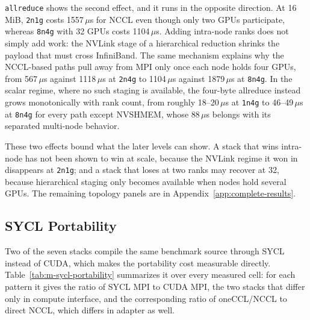 \texttt{allreduce} shows the second effect, and it runs in the opposite direction. At 16\,MiB, \texttt{2n1g} costs 1557\,$\mu$s for NCCL even though only two GPUs participate, whereas \texttt{8n4g} with 32 GPUs costs 1104\,$\mu$s. Adding intra-node ranks does not simply add work: the NVLink stage of a hierarchical reduction shrinks the payload that must cross InfiniBand. The same mechanism explains why the NCCL-based paths pull away from MPI only once each node holds four GPUs, from 567\,$\mu$s against 1118\,$\mu$s at \texttt{2n4g} to 1104\,$\mu$s against 1879\,$\mu$s at \texttt{8n4g}. In the scalar regime, where no such staging is available, the four-byte allreduce instead grows monotonically with rank count, from roughly 18--20\,$\mu$s at \texttt{1n4g} to 46--49\,$\mu$s at \texttt{8n4g} for every path except NVSHMEM, whose 88\,$\mu$s belongs with its separated multi-node behavior.

These two effects bound what the later levels can show. A stack that wins intra-node has not been shown to win at scale, because the NVLink regime it won in disappears at \texttt{2n1g}; and a stack that loses at two ranks may recover at 32, because hierarchical staging only becomes available when nodes hold several GPUs. The remaining topology panels are in Appendix~\ref{app:complete-results}.

\subsection{SYCL Portability}\label{sec:sycl-portability}

Two of the seven stacks compile the same benchmark source through SYCL instead of CUDA, which makes the portability cost measurable directly. Table~\ref{tab:m-sycl-portability} summarizes it over every measured cell: for each pattern it gives the ratio of SYCL MPI to CUDA MPI, the two stacks that differ only in compute interface, and the corresponding ratio of oneCCL/NCCL to direct NCCL, which differs in adapter as well.

